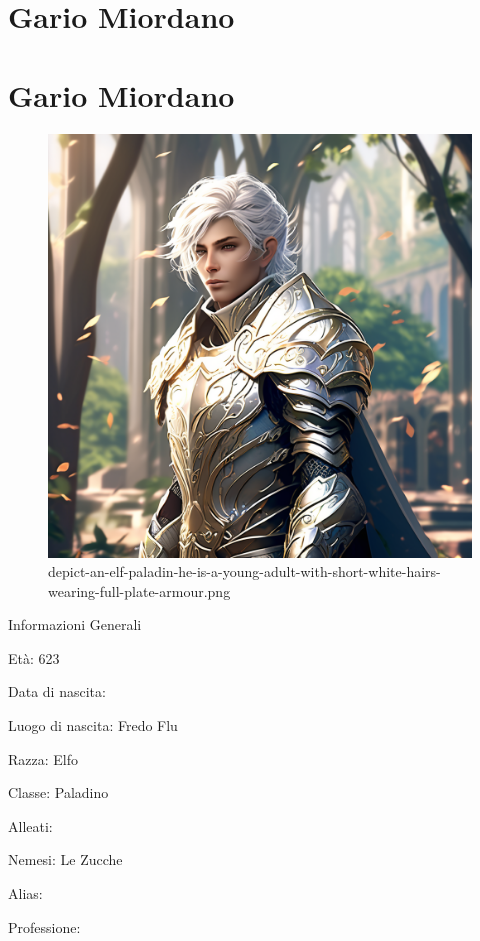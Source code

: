 \section{Gario Miordano}\label{gario-miordano}
\section{Gario Miordano}\label{gario-miordano-1}


\begin{figure}
\centering
\includegraphics{depict-an-elf-paladin-he-is-a-young-adult-with-short-white-hairs-wearing-full-plate-armour.png}
\caption{depict-an-elf-paladin-he-is-a-young-adult-with-short-white-hairs-wearing-full-plate-armour.png}
\end{figure}

Informazioni Generali

Età: 623

Data di nascita:

Luogo di nascita: Fredo Flu

Razza: Elfo

Classe: Paladino

Alleati:

Nemesi: Le Zucche

Alias:

Professione:


